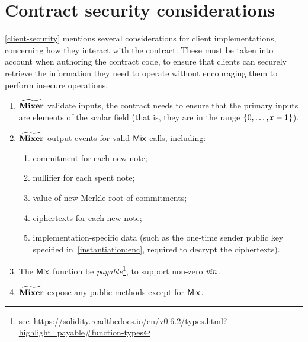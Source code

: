 
\section{Contract security considerations}\label{contract-security}

\cref{client-security} mentions several considerations for client implementations, concerning how they interact with the contract. These must be taken into account when authoring the contract code, to ensure that clients can securely retrieve the information they need to operate without encouraging them to perform insecure operations.

\begin{enumerate}
  \item $\widetilde{\mathbf{Mixer}}$ \MUST{} validate inputs, the contract needs to ensure that the primary inputs are elements of the scalar field \FFx{\rCURVE} (that is, they are in the range $\{{0},\ldots,{\mathtt{r} - 1}\}$).
  \item $\widetilde{\mathbf{Mixer}}$ \MUST{} output events for valid $\mathsf{Mix}$ calls, including:
      \begin{enumerate}
        \item commitment for each new note;
        \item nullifier for each spent note;
        \item value of new Merkle root of commitments;
        \item ciphertexts for each new note;
        \item implementation-specific data (such as the one-time sender public key specified in~\cref{instantiation:enc}, required to decrypt the ciphertexts).
      \end{enumerate}
  \item\label{contract-security:mixer-payable} The $\mathsf{Mix}$ function \MUST{} be \emph{payable}\footnote{see~\url{https://solidity.readthedocs.io/en/v0.6.2/types.html?highlight=payable\#function-types}}, to support non-zero $\mathit{vin}$.
  \item $\widetilde{\mathbf{Mixer}}$ \MUSTNOT{} expose any public methods except for $\mathsf{Mix}$.
\end{enumerate}
